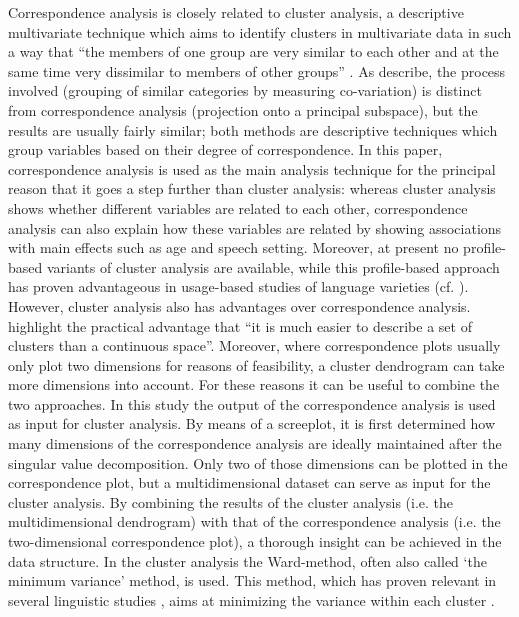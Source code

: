 \documentclass[output=paper]{LSP/langsci}
\begin{document}
Correspondence analysis is closely related to cluster analysis, a descriptive multivariate technique which aims to identify clusters in multivariate data in such a way that “the members of one group are very similar to each other and at the same time very dissimilar to members of other groups” \citep[337]{gries_statistics_2013}. As \citet{lebart_correspondence_1993} describe, the process involved (grouping of similar categories by measuring co-variation) is distinct from correspondence analysis (projection onto a principal subspace), but the results are usually fairly similar; both methods are descriptive techniques which group variables based on their degree of correspondence. In this paper, correspondence analysis is used as the main analysis technique for the principal reason that it goes a step further than cluster analysis: whereas cluster analysis shows whether different variables are related to each other, correspondence analysis can also explain how these variables are related by showing associations with main effects such as age and speech setting. Moreover, at present no profile-based variants of cluster analysis are available, while this profile-based approach has proven advantageous in usage-based studies of language varieties (cf. \citealt{speelman_profile-based_2003}). However, cluster analysis also has advantages over correspondence analysis. \citet[15]{lebart_correspondence_1993} highlight the practical advantage that “it is much easier to describe a set of clusters than a continuous space”. Moreover, where correspondence plots usually only plot two dimensions for reasons of feasibility, a cluster dendrogram can take more dimensions into account. For these reasons it can be useful to combine the two approaches. In this study the output of the correspondence analysis is used as input for cluster analysis. By means of a screeplot, it is first determined how many dimensions of the correspondence analysis are ideally maintained after the singular value decomposition. Only two of those dimensions can be plotted in the correspondence plot, but a multidimensional dataset can serve as input for the cluster analysis. By combining the results of the cluster analysis (i.e. the multidimensional dendrogram) with that of the correspondence analysis (i.e. the two-dimensional correspondence plot), a thorough insight can be achieved in the data structure. In the cluster analysis the Ward-method, often also called ‘the minimum variance’ method, is used. This method, which has proven relevant in several linguistic studies \citep{gries_statistics_2013}, aims at minimizing the variance within each cluster \citep[317]{gries_statistics_2013}.
\end{document}
